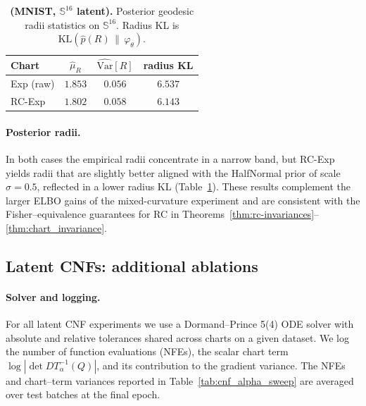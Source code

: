 \documentclass{article}
\theoremstyle{definition}
\theoremstyle{remark}
\newcommand{\SSS}{\mathbb{S}}
\begin{document}
\begin{table}[H]
  \centering
  \caption{\textbf{(MNIST, $\SSS^{16}$ latent).}
  Posterior geodesic radii statistics on $\SSS^{16}$.
  Radius KL is $\mathrm{KL}(\widehat p(R)\,\|\,\varphi_\theta)$.}
  \label{tab:E2_rstats}
  \begin{tabular}{lccc}
    \toprule
    Chart & $\hat\mu_R$ & $\widehat{\mathrm{Var}}[R]$ & radius KL \\
    \midrule
    Exp (raw) & $1.853$ & $0.056$ & $6.537$ \\
    RC-Exp   & $1.802$ & $0.058$ & $6.143$ \\
    \bottomrule
  \end{tabular}
\end{table}



\paragraph{Posterior radii.}
In both cases the empirical radii concentrate in a narrow band, but RC-Exp yields radii that
are slightly better aligned with the HalfNormal prior of scale $\sigma=0.5$, reflected in a lower
radius KL (Table~\ref{tab:E2_rstats}).
These results complement the larger ELBO gains of the mixed-curvature experiment and are consistent with the Fisher--equivalence guarantees for RC in
Theorems~\ref{thm:rc-invariances}--\ref{thm:chart_invariance}.

\subsection*{Latent CNFs: additional ablations}
\label{app:E3E6_details}



\paragraph{Solver and logging.}
For all latent CNF experiments we use a Dormand--Prince 5(4) ODE solver with absolute and
relative tolerances shared across charts on a given dataset.
We log the number of function evaluations (NFEs), the scalar chart term
$\log|\det DT_\alpha^{-1}(Q)|$, and its contribution to the gradient variance.
The NFEs and chart--term variances reported in Table~\ref{tab:cnf_alpha_sweep} are averaged over test batches at the final epoch.
\end{document}

